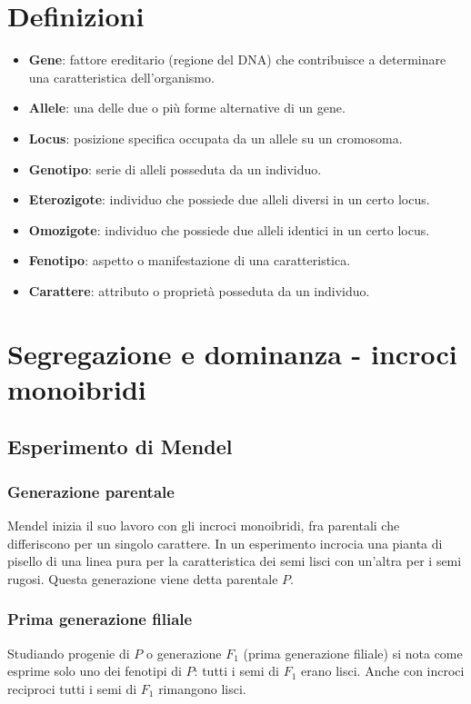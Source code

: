 \section{Definizioni}
\begin{multicols}{2}
	\begin{itemize}
		\item \textbf{Gene}: fattore ereditario (regione del DNA) che contribuisce a determinare una caratteristica dell'organismo.
		\item \textbf{Allele}: una delle due o pi\`u forme alternative di un gene.
		\item \textbf{Locus}: posizione specifica occupata da un allele su un cromosoma.
		\item \textbf{Genotipo}: serie di alleli posseduta da un individuo.
		\item \textbf{Eterozigote}: individuo che possiede due alleli diversi in un certo locus.
		\item \textbf{Omozigote}: individuo che possiede due alleli identici in un certo locus.
		\item \textbf{Fenotipo}: aspetto o manifestazione di una caratteristica.
		\item \textbf{Carattere}: attributo o propriet\`a posseduta da un individuo.
	\end{itemize}

\end{multicols}
\section{Segregazione e dominanza - incroci monoibridi}
\subsection{Esperimento di Mendel}
\subsubsection{Generazione parentale}
Mendel inizia il suo lavoro con gli incroci monoibridi, fra parentali che differiscono per un singolo carattere. In un esperimento incrocia una pianta di pisello di una linea pura per la caratteristica
dei semi lisci con un'altra per i semi rugosi. Questa generazione viene detta parentale $P$. 
\subsubsection{Prima generazione filiale}
Studiando progenie di $P$ o generazione $F_1$ (prima generazione filiale) si nota come esprime solo uno dei fenotipi di $P$: tutti i semi di $F_1$ erano lisci. Anche con incroci reciproci tutti i semi di 
$F_1$ rimangono lisci. 
